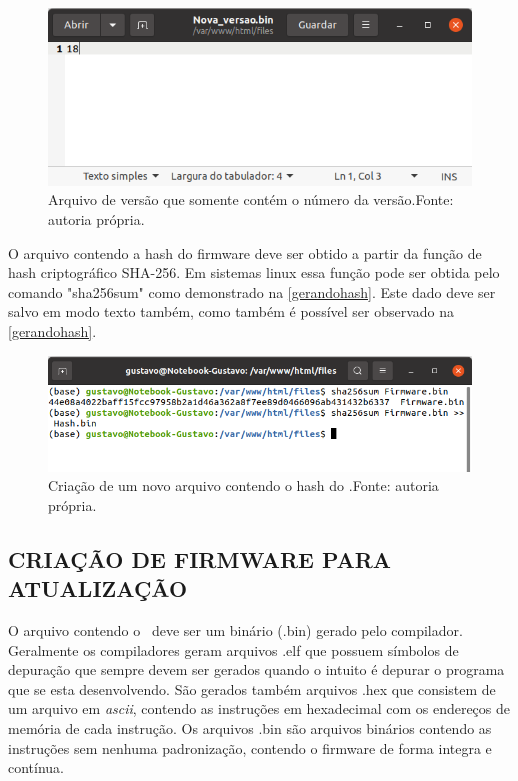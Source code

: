 \begin{figure}[H]
    \scriptsize
     \centering
     \includegraphics[scale=0.9]{dados/figuras/arquivodeversao.png}
     \caption{Arquivo de versão que somente contém o número da versão.\newline Fonte: autoria própria.}
     \label{arquivoversao}
\end{figure}

O arquivo contendo a hash do firmware deve ser obtido a partir da função de hash criptográfico SHA-256. Em sistemas linux essa função pode ser obtida pelo comando "sha256sum" como demonstrado na \autoref{gerandohash}. Este dado deve ser salvo em modo texto também, como também é possível ser observado na \autoref{gerandohash}.

\begin{figure}[H]
    \scriptsize
     \centering
     \includegraphics[scale=0.8]{dados/figuras/hashcreate.png}
     \caption{Criação de um novo arquivo contendo o hash do \firmware.\newline Fonte: autoria própria.}
     \label{gerandohash}
\end{figure}
\subsection{CRIAÇÃO DE FIRMWARE PARA ATUALIZAÇÃO}
O arquivo contendo o \firmware\ deve ser um binário (.bin) gerado pelo compilador. Geralmente os compiladores geram arquivos .elf que possuem símbolos de depuração que sempre devem ser gerados quando o intuito é depurar o programa que se esta desenvolvendo. São gerados também arquivos .hex que consistem de um arquivo em \textit{ascii}, contendo as instruções em hexadecimal com os endereços de memória de cada instrução. Os arquivos .bin são arquivos binários contendo as instruções sem nenhuma padronização, contendo o firmware de forma integra e contínua.

